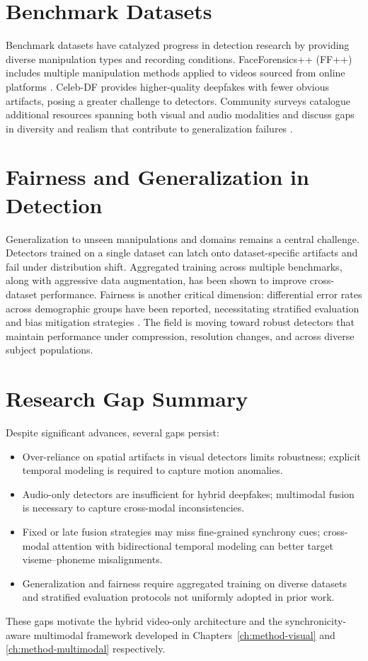\section{Benchmark Datasets}
Benchmark datasets have catalyzed progress in detection research by providing diverse manipulation types and recording conditions. FaceForensics++ (FF++) includes multiple manipulation methods applied to videos sourced from online platforms \cite{rossler2019faceforensics}. Celeb-DF \cite{li2020celebdf} provides higher-quality deepfakes with fewer obvious artifacts, posing a greater challenge to detectors. Community surveys catalogue additional resources spanning both visual and audio modalities and discuss gaps in diversity and realism that contribute to generalization failures \cite{gong2024survey}.

\section{Fairness and Generalization in Detection}
Generalization to unseen manipulations and domains remains a central challenge. Detectors trained on a single dataset can latch onto dataset-specific artifacts and fail under distribution shift. Aggregated training across multiple benchmarks, along with aggressive data augmentation, has been shown to improve cross-dataset performance. Fairness is another critical dimension: differential error rates across demographic groups have been reported, necessitating stratified evaluation and bias mitigation strategies \cite{mubarak2023survey}. The field is moving toward robust detectors that maintain performance under compression, resolution changes, and across diverse subject populations.

\section{Research Gap Summary}
Despite significant advances, several gaps persist:
\begin{itemize}[leftmargin=*]
    \item Over-reliance on spatial artifacts in visual detectors limits robustness; explicit temporal modeling is required to capture motion anomalies.
    \item Audio-only detectors are insufficient for hybrid deepfakes; multimodal fusion is necessary to capture cross-modal inconsistencies.
    \item Fixed or late fusion strategies may miss fine-grained synchrony cues; cross-modal attention with bidirectional temporal modeling can better target viseme–phoneme misalignments.
    \item Generalization and fairness require aggregated training on diverse datasets and stratified evaluation protocols not uniformly adopted in prior work.
\end{itemize}
These gaps motivate the hybrid video-only architecture and the synchronicity-aware multimodal framework developed in Chapters~\ref{ch:method-visual} and \ref{ch:method-multimodal} respectively.

